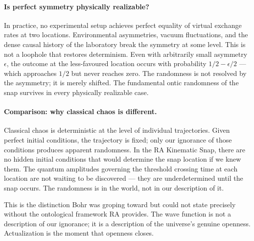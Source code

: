 \documentclass[11pt,a4paper]{article}
\theoremstyle{plain}
\theoremstyle{definition}
\theoremstyle{remark}
\begin{document}
\paragraph{Is perfect symmetry physically realizable?}
In practice, no experimental setup achieves perfect equality of virtual exchange
rates at two locations. Environmental asymmetries, vacuum fluctuations, and the
dense causal history of the laboratory break the symmetry at some level. This is
not a loophole that restores determinism. Even with arbitrarily small asymmetry
$\epsilon$, the outcome at the less-favoured location occurs with probability
$1/2 - \epsilon/2$ --- which approaches $1/2$ but never reaches zero. The
randomness is not resolved by the asymmetry; it is merely shifted. The fundamental
ontic randomness of the snap survives in every physically realizable case.

\paragraph{Comparison: why classical chaos is different.}
Classical chaos is deterministic at the level of individual trajectories. Given
perfect initial conditions, the trajectory is fixed; only our ignorance of those
conditions produces apparent randomness. In the RA Kinematic Snap, there are no
hidden initial conditions that would determine the snap location if we knew them.
The quantum amplitudes governing the threshold crossing time at each location are
not waiting to be discovered --- they are underdetermined until the snap occurs.
The randomness is in the world, not in our description of it.

This is the distinction Bohr was groping toward but could not state precisely
without the ontological framework RA provides. The wave function is not a
description of our ignorance; it is a description of the universe's genuine
openness. Actualization is the moment that openness closes.
\end{document}
